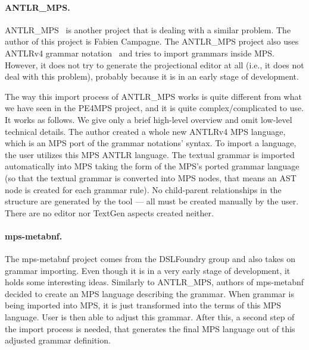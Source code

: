 \paragraph{ANTLR{\_}MPS.}
ANTLR{\_}MPS~\cite{ANTLR2MPS} is another project that is dealing with a similar problem.
The author of this project is Fabien Campagne.
The ANTLR{\_}MPS project also uses ANTLRv4 grammar notation~\cite{ANTLR4} and tries to import grammars inside MPS.
However, it does not try to generate the projectional editor at all (i.e., it does not deal with this problem), probably because it is in an early stage of development.

The way this import process of ANTLR{\_}MPS works is quite different from what we have seen in the PE4MPS project, and it is quite complex/complicated to use.
It works as follows. We give only a brief high-level overview and omit low-level technical details.
The author created a whole new ANTLRv4 MPS language, which is an MPS port of the grammar notations' syntax.
To import a language, the user utilizes this MPS ANTLR language.
The textual grammar is imported automatically into MPS taking the form of the MPS's ported grammar language (so that the textual grammar is converted into MPS nodes, that means an AST node is created for each grammar rule).
No child-parent relationships in the structure are generated by the tool --- all must be created manually by the user.
There are no editor nor TextGen aspects created neither.

\paragraph{mps-metabnf.}
The mps-metabnf project comes from the DSLFoundry group and also takes on grammar importing.
Even though it is in a very early stage of development, it holds some interesting ideas.
Similarly to ANTLR{\_}MPS, authors of mps-metabnf decided to create an MPS language describing the grammar.
When grammar is being imported into MPS, it is just transformed into the terms of this MPS language.
User is then able to adjust this grammar.
After this, a second step of the import process is needed, that generates the final MPS language out of this adjusted grammar definition.

